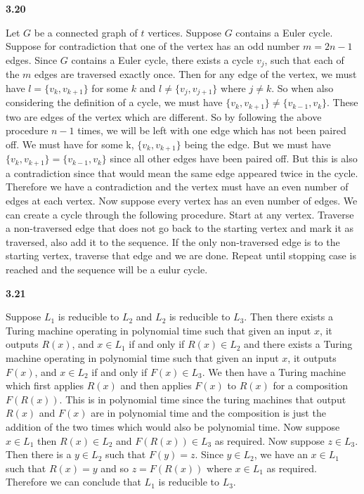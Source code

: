 \textbf{3.20}

Let $G$ be a connected graph of $t$ vertices. Suppose $G$ contains a Euler cycle. Suppose for contradiction that one of the vertex has an odd number $m = 2n-1$ edges. Since $G$ contains a Euler cycle, there exists a cycle $v_j$, such that each of the $m$ edges are traversed exactly once. Then for any edge of the vertex, we must have $l = \{v_k,v_{k+1}\}$ for some $k$ and $l\neq \{v_j,v_{j+1}\}$ where $j\neq k$. So when also considering the definition of a cycle, we must have $\{v_k,v_{k+1}\}\neq\{v_{k-1},v_{k}\}$. These two are edges of the vertex which are different. So by following the above procedure $n-1$ times, we will be left with one edge which has not been paired off. We must have for some  k, $\{v_k,v_{k+1}\}$ being the edge. But we must have $\{v_k,v_{k+1}\} = \{v_{k-1},v_{k}\}$ since all other edges have been paired off. But this is also a contradiction since that would mean the same edge appeared twice in the cycle. Therefore we have a contradiction and the vertex must have an even number of edges at each vertex. Now suppose every vertex has an even number of edges. We can create a cycle through the following procedure. Start at any vertex. Traverse a non-traversed edge that does not go back to the starting vertex and mark it as traversed, also add it to the sequence. If the only non-traversed edge is to the starting vertex, traverse that edge and we are done. Repeat until stopping case is reached and the sequence will be a eulur cycle.

\textbf{3.21}

Suppose $L_1$ is reducible to $L_2$ and $L_2$ is reducible to $L_3$. Then there exists a Turing machine operating in polynomial time such that given an input $x$, it outputs $R(x)$, and $x\in L_1$ if and only if $R(x)\in L_2$ and there exists a Turing machine operating in polynomial time such that given an input $x$, it outputs $F(x)$, and $x\in L_2$ if and only if $F(x)\in L_3$. We then have a Turing machine which first applies $R(x)$ and then applies $F(x)$ to $R(x)$ for a composition $F(R(x))$. This is in polynomial time since the turing machines that output $R(x)$ and $F(x)$ are in polynomial time and the composition is just the addition of the two times which would also be polynomial time. Now suppose $x\in L_1$ then $R(x)\in L_2$ and $F(R(x))\in L_3$ as required. Now suppose $z\in L_3$. Then there is a $y\in L_2$ such that $ F(y)=z$. Since $y\in L_2$, we have an $x\in L_1 $ such that $R(x) = y$ and so $z = F(R(x))$ where $x\in L_1$ as required. Therefore we can conclude that $L_1$ is reducible to $L_3$.

